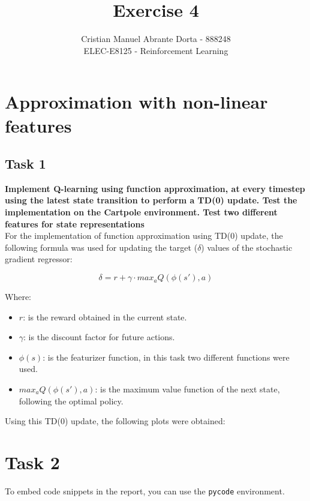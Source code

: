 \documentclass[12pt]{article}
\begin{document}
 
\title{Exercise 4}
\author{Cristian Manuel Abrante Dorta - 888248\\
ELEC-E8125 - Reinforcement Learning}

\maketitle
\section{Approximation with non-linear features}

\subsection{Task 1}
\textbf{Implement Q-learning using function approximation, at every timestep using the latest state transition to perform a TD(0) update. Test the implementation on the
Cartpole environment. Test two different features for state representations}\\

For the implementation of function approximation using TD(0) update, the following formula was used for updating the target ($\delta$) values of the stochastic gradient regressor:

\begin{equation}
    \delta = r + \gamma \cdot max_a {Q(\phi(s'), a)}
\end{equation}

Where:

\begin{itemize}
    \item $r$: is the reward obtained in the current state.
    \item $\gamma$: is the discount factor for future actions.
    \item $\phi(s)$: is the featurizer function, in this task two different functions were used.
    \item $max_aQ(\phi(s'), a)$: is the maximum value function of the next state, following the optimal policy.
\end{itemize}

Using this TD(0) update, the following plots were obtained:



\section{Task 2}
To embed code snippets in the report, you can use the \texttt{pycode} environment.
\end{document}
